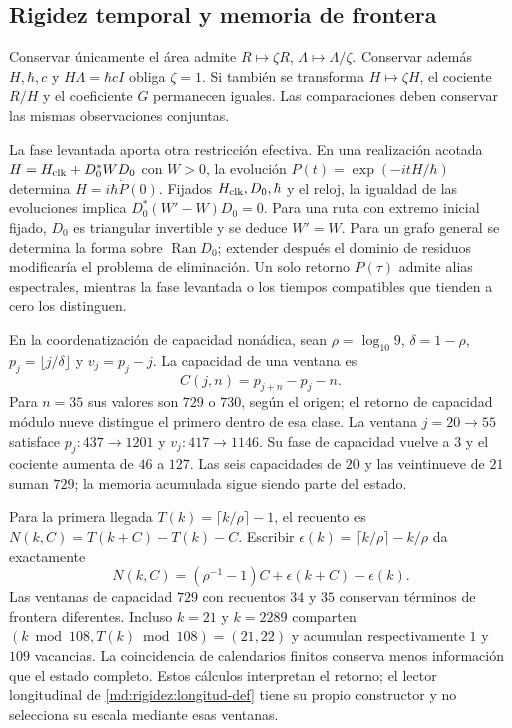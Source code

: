 \subsection{Rigidez temporal y memoria de frontera}
\label{md:rigidez:memoria}

Conservar únicamente el área admite $R\mapsto\zeta R$,
$\Lambda\mapsto\Lambda/\zeta$. Conservar además $H,\hbar,c$ y
$H\Lambda=\hbar cI$ obliga $\zeta=1$. Si también se transforma
$H\mapsto\zeta H$, el cociente $R/H$ y el coeficiente $G$ permanecen
iguales. Las comparaciones deben conservar las mismas observaciones conjuntas.

La fase levantada aporta otra restricción efectiva. En una realización
acotada $H=H_{\rm clk}+D_0^*WD_0$ con $W>0$, la evolución
$P(t)=\exp(-itH/\hbar)$ determina $H=i\hbar\dot P(0)$.
Fijados $H_{\rm clk},D_0,\hbar$ y el reloj, la igualdad de las evoluciones
implica $D_0^*(W'-W)D_0=0$. Para una ruta con extremo inicial fijado,
$D_0$ es triangular invertible y se deduce $W'=W$. Para un grafo general
se determina la forma sobre $\operatorname{Ran}D_0$; extender después el
dominio de residuos modificaría el problema de eliminación.
Un solo retorno $P(\tau)$ admite alias espectrales, mientras la fase
levantada o los tiempos compatibles que tienden a cero los distinguen.

En la coordenatización de capacidad nonádica, sean
$\rho=\log_{10}9$, $\delta=1-\rho$,
$p_j=\lfloor j/\delta\rfloor$ y $v_j=p_j-j$. La capacidad de una ventana es
\[
 C(j,n)=p_{j+n}-p_j-n.
\]
Para $n=35$ sus valores son $729$ o $730$, según el origen; el retorno de
capacidad módulo nueve distingue el primero dentro de esa clase.
La ventana $j=20\to55$ satisface $p_j:437\to1201$ y
$v_j:417\to1146$. Su fase de capacidad vuelve a $3$ y el cociente aumenta
de $46$ a $127$. Las seis capacidades de $20$ y las veintinueve de $21$
suman $729$; la memoria acumulada sigue siendo parte del estado.

Para la primera llegada $T(k)=\lceil k/\rho\rceil-1$, el recuento es
$N(k,C)=T(k+C)-T(k)-C$. Escribir
$\epsilon(k)=\lceil k/\rho\rceil-k/\rho$ da exactamente
\[
 N(k,C)=(\rho^{-1}-1)C+\epsilon(k+C)-\epsilon(k).
\]
Las ventanas de capacidad $729$ con recuentos $34$ y $35$ conservan
términos de frontera diferentes. Incluso $k=21$ y $k=2289$ comparten
$(k\bmod108,T(k)\bmod108)=(21,22)$ y acumulan respectivamente $1$ y
$109$ vacancias. La coincidencia de calendarios finitos conserva menos
información que el estado completo. Estos cálculos interpretan el retorno;
el lector longitudinal de \eqref{md:rigidez:longitud-def} tiene su propio
constructor y no selecciona su escala mediante esas ventanas.

